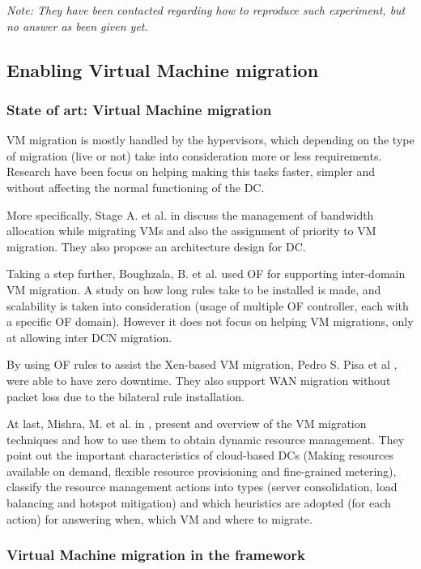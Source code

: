 \documentclass[12pt,english,oneside]{book}
\begin{document}
\textit{Note: They have been contacted regarding how to reproduce such experiment, but no answer as been given yet.}

\newpage

\subsection{Enabling Virtual Machine migration}
\subsubsection{State of art: Virtual Machine migration}

VM migration is mostly handled by the hypervisors, which depending on the type of migration (live or not) take into consideration more or less requirements.
Research have been focus on helping making this tasks faster, simpler and without affecting the normal functioning of the DC.

More specifically, Stage A. et al. in \cite{vmmig1} discuss the management of bandwidth allocation while migrating VMs and also the assignment of priority to VM migration. They also propose an architecture design for DC.

Taking a step further, Boughzala, B. et al. \cite{vmmig2} used OF for supporting inter-domain VM migration. A study on how long rules take to be installed is made, and scalability is taken into consideration (usage of multiple OF controller, each with a specific OF domain). However it does not focus on helping VM migrations, only at allowing inter DCN migration.

By using OF rules to assist the Xen-based VM migration, Pedro S. Pisa et al \cite{vmmig3}, were able to have zero downtime. They also support WAN migration without packet loss due to the bilateral rule installation.

At last, Mishra, M. et al. in \cite{vmmig4}, present and overview of the VM migration techniques and how to use them to obtain dynamic resource management.
They point out the important characteristics of cloud-based DCs (Making resources available on demand, flexible resource provisioning and fine-grained metering), classify the resource management actions into types (server consolidation, load balancing and hotspot mitigation) and which heuristics are adopted (for each action) for answering when, which VM and where to migrate.

\subsubsection{Virtual Machine migration in the framework}
\end{document}
